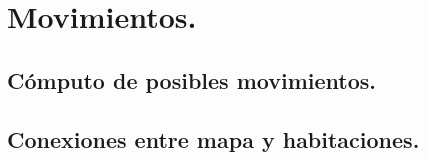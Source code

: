 \chapter{Movimientos.}\label{cap:capitulo4}



\section{Cómputo de posibles movimientos.}


\section{Conexiones entre mapa y habitaciones.}



